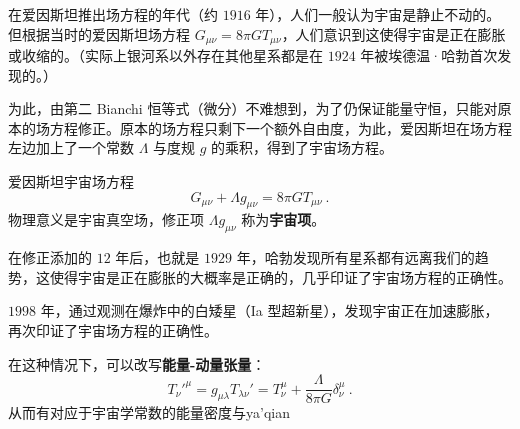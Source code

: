 

在爱因斯坦推出场方程的年代（约 $1916$ 年），人们一般认为宇宙是静止不动的。但根据当时的爱因斯坦场方程 $ G_{\mu \nu} = 8 \pi G  T_{\mu \nu}$，人们意识到这使得宇宙是正在膨胀或收缩的。（实际上银河系以外存在其他星系都是在 $1924$ 年被埃德温·哈勃首次发现的。）

为此，由第二 Bianchi 恒等式（微分）不难想到，为了仍保证能量守恒，只能对原本的场方程修正。原本的场方程只剩下一个额外自由度，为此，爱因斯坦在场方程左边加上了一个常数 $\Lambda$ 与度规 $g$ 的乘积，得到了宇宙场方程。

\begin{theorem}{爱因斯坦宇宙场方程}
$$G_{\mu \nu} + \Lambda g_{\mu \nu} = 8\pi G T_{\mu \nu} ~.$$
物理意义是宇宙真空场，修正项 $\Lambda g_{\mu \nu}$ 称为\textbf{宇宙项}。
\end{theorem}

在修正添加的 $12$ 年后，也就是 $1929$ 年，哈勃发现所有星系都有远离我们的趋势，这使得宇宙是正在膨胀的大概率是正确的，几乎印证了宇宙场方程的正确性。

$1998$ 年，通过观测在爆炸中的白矮星（Ia 型超新星），发现宇宙正在加速膨胀，再次印证了宇宙场方程的正确性。

在这种情况下，可以改写\textbf{能量-动量张量}：
\begin{equation}
{{T_{\nu}'}^{\mu}} = g_{\mu \lambda} T_{\lambda \nu}' = T_{\nu}^{\mu} + \frac{\Lambda}{8 \pi G} \delta_{\nu}^{\mu} ~.
\end{equation}
从而有对应于宇宙学常数的能量密度与ya'qian
